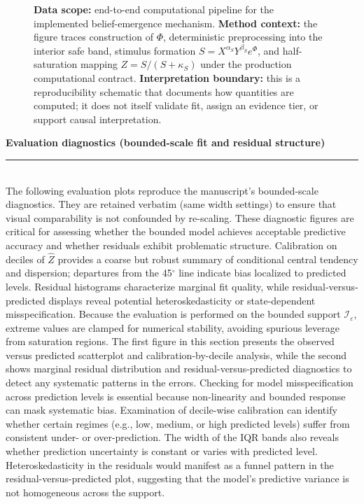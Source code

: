 \documentclass[11pt]{article}
\newcommand{\SubRule}{\color{black}\rule{\linewidth}{0.4pt}}
\newcommand{\Section}[1]{\noindent\textbf{#1}\\[-0.25em]\SubRule\\[0.1em]}
\begin{document}
{\begin{figure}[!htbp]
\begin{minipage}[t]{0.67\linewidth}
{{{}%
}%
}%
\end{minipage}%
\hfill
\begin{minipage}[t]{0.30\linewidth}
\vspace{0pt}%
\captionsetup{justification=justified,singlelinecheck=false}
\caption{\textbf{Data scope:} end-to-end computational pipeline for the implemented belief-emergence mechanism. \textbf{Method context:} the figure traces construction of $\Phi$, deterministic preprocessing into the interior safe band, stimulus formation $S=X^{\alpha_{S}}Y^{\beta_{S}}e^{\Phi}$, and half-saturation mapping $Z=S/(S+\kappa_{S})$ under the production computational contract. \textbf{Interpretation boundary:} this is a reproducibility schematic that documents how quantities are computed; it does not itself validate fit, assign an evidence tier, or support causal interpretation.}
\label{fig:model-pipeline}
\end{minipage}
\endgroup
\end{figure}
}
\Section{Evaluation diagnostics (bounded-scale fit and residual structure)}
\noindent\justifying
The following evaluation plots reproduce the manuscript’s bounded-scale diagnostics. They are retained
verbatim (same width settings) to ensure that visual comparability is not confounded by re-scaling. These diagnostic figures are critical for assessing whether the bounded model achieves acceptable predictive accuracy and whether residuals exhibit problematic structure.
\noindent\justifying
Calibration on deciles of $\widehat{Z}$ provides a coarse but robust summary of conditional central tendency and dispersion;
departures from the 45$^\circ$ line indicate bias localized to predicted levels. Residual histograms characterize
marginal fit quality, while residual-versus-predicted displays reveal potential heteroskedasticity or state-dependent
misspecification. Because the evaluation is performed on the bounded support $\mathcal{I}_\varepsilon$, extreme values are
clamped for numerical stability, avoiding spurious leverage from saturation regions. The first figure in this section presents the observed versus predicted scatterplot and calibration-by-decile analysis, while the second shows marginal residual distribution and residual-versus-predicted diagnostics to detect any systematic patterns in the errors.
\noindent\justifying
Checking for model misspecification across prediction levels is essential because non-linearity and bounded response can mask systematic bias. Examination of decile-wise calibration can identify whether certain regimes (e.g., low, medium, or high predicted levels) suffer from consistent under- or over-prediction. The width of the IQR bands also reveals whether prediction uncertainty is constant or varies with predicted level. Heteroskedasticity in the residuals would manifest as a funnel pattern in the residual-versus-predicted plot, suggesting that the model's predictive variance is not homogeneous across the support.
\end{document}
